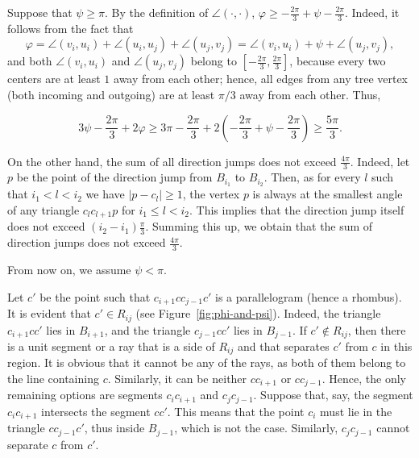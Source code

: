 \begin{enumerate}[label={\bf Case \arabic*: }, wide, labelwidth=!, labelindent=0pt]
Suppose that $\psi\geq\pi$. By the definition of $\angle(\cdot, \cdot)$, $\varphi\geq-\frac{2\pi}{3} + \psi - \frac{2\pi}{3}$. Indeed, it follows from the fact that
$$\varphi = \angle(v_i, u_i) + \angle(u_i, u_j) + \angle(u_j, v_j) = \angle(v_i, u_i) + \psi + \angle(u_j, v_j),$$
and both $\angle(v_i, u_i)$ and $\angle(u_j, v_j)$ belong to $\left[-\frac{2\pi}{3}, \frac{2\pi}{3}\right]$, because every two centers are at least $1$ away from each other; hence, all edges from any tree vertex (both incoming and outgoing) are at least $\pi/3$ away from each other. Thus,

$$3\psi - \frac{2\pi}{3} + 2\varphi\geq 3\pi - \frac{2\pi}{3} + 2\left(-\frac{2\pi}{3} + \psi - \frac{2\pi}{3}\right)\geq \frac{5\pi}{3}.$$

On the other hand, the sum of all direction jumps does not exceed $\frac{4\pi}{3}$. Indeed,
let $p$ be the point of the direction jump from $B_{i_1}$ to $B_{i_2}$. Then, as for every $l$ such that $i_1 < l < i_2$ we have $|p - c_l|\geq 1$, the vertex $p$ is always at the smallest angle of any triangle $c_lc_{l+1}p$ for $i_1\leq l < i_2$. This implies that the direction jump itself does not exceed $(i_2 - i_1)\frac{\pi}{3}$. Summing this up, we obtain that the sum of direction jumps does not exceed $\frac{4\pi}{3}$.

From now on, we assume $\psi < \pi$.

Let $c'$ be the point such that $c_{i+1}cc_{j-1}c'$ is a parallelogram (hence a rhombus). It is evident that $c'\in R_{ij}$ (see Figure~\ref{fig:phi-and-psi}). Indeed, the triangle $c_{i+1}cc'$ lies in $B_{i+1}$, and the triangle $c_{j-1}cc'$ lies in $B_{j-1}$. If $c'\notin R_{ij}$, then there is a unit segment or a ray that is a side of $R_{ij}$ and that separates $c'$ from $c$ in this region. %
It is obvious that it cannot be any of the rays, as both of them belong to the line containing $c$. Similarly, it can be neither $cc_{i+1}$ or $cc_{j-1}$. Hence, the only remaining options are segments $c_ic_{i+1}$ and $c_jc_{j-1}$. Suppose that, say, the segment $c_ic_{i+1}$ intersects the segment $cc'$. This means that the point $c_i$ must lie in the triangle $cc_{j-1}c'$, thus inside $B_{j-1}$, which is not the case. Similarly, $c_jc_{j-1}$ cannot separate $c$ from $c'$.


\end{enumerate}
